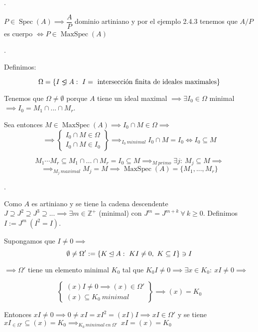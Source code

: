 \documentclass[openany]{book}
\begin{document}
\begin{demonstration}
    .

    $ P \in \operatorname{Spec}(A) \implies \dfrac{A}{P} $ dominio artiniano y por el ejemplo 2.4.3 tenemos que $ A/P $ es cuerpo $ \iff P \in \operatorname{MaxSpec}(A)$  

    .

    Definimos:

    $$ \Omega = \{I \properideal A :\ I = \text{ intersección finita de ideales maximales}\} $$

    Tenemos que $ \Omega \ne \emptyset $ porque $ A $ tiene un ideal maximal $ \implies \exists I_0 \in \Omega$ minimal $ \implies I_0 = M_1 \cap ... \cap M_{r} $.

    Sea entonces $ M \in \operatorname{MaxSpec}(A) \implies I_0 \cap M \in \Omega \implies $
    $$ \implies \left\{
    \begin{array}{l}
        I_0 \cap M \in \Omega \\
        I_0 \cap M \in I_0
    \end{array}
    \right\} \implies_{I_0\ minimal} I_0 \cap M = I_0 \iff I_0 \subseteq  M  $$

    $$  M_1\cdots M_r \subseteq M_1 \cap ... \cap M_{r} = I_0 \subseteq M \implies_{ M\ primo} \exists j :\ M_j \subseteq M \implies $$  
    $$ \implies_{M_j\ maximal} M_j = M \implies \operatorname{MaxSpec}(A ) = \{M_1,...,M_{r}\}$$

    .

    Como $ A $ es artiniano y se tiene la cadena descendente $ J \supseteq J^2 \supseteq J^3 \supseteq ... \implies \exists m \in \mathbb{Z}^{+}$ (minimal) con $ J^{m} = J^{m+k}\ \forall\  k\geq  0 $. Definimos $ I:= J^{m}\ (I^2 = I) $.

    Supongamos que $ I \ne 0 \implies  $
    $$ \emptyset \ne \Omega' := \{K \unlhd A:\ KI \ne 0,\ K \subseteq I\} \ni I$$

    $ \implies \Omega' $ tiene un elemento minimal $ K_0 $ tal que $ K_0I \ne 0 \implies \exists x \in K_0 :\ xI \ne 0 \implies$

    $$ \left\{
    \begin{array}{l}
        (x)I \ne 0 \implies (x) \in \Omega'\\
        (x) \subseteq  K_0\ minimal
    \end{array}
    \right\} \implies (x) = K_0  $$

    Entonces $ xI \ne 0 \implies 0 \ne xI = xI^2 = (xI)I \implies xI \in \Omega'  $ y se tiene $ xI_{\in \Omega'} \subseteq (x) = K_0 \implies_{K_0\ minimal\ en\ \Omega'}\ xI = (x) = K_0$


\end{demonstration}
\end{document}

